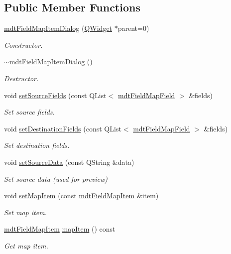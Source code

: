 \subsection*{Public Member Functions}
\begin{DoxyCompactItemize}
\item 
\hyperlink{classmdt_field_map_item_dialog_ac745bae9c7ce26f72aa081bc54ac5f22}{mdt\-Field\-Map\-Item\-Dialog} (\hyperlink{class_q_widget}{Q\-Widget} $\ast$parent=0)
\begin{DoxyCompactList}\small\item\em Constructor. \end{DoxyCompactList}\item 
\hyperlink{classmdt_field_map_item_dialog_a12f195eeceb6729557a9e05835b7ca3f}{$\sim$mdt\-Field\-Map\-Item\-Dialog} ()
\begin{DoxyCompactList}\small\item\em Destructor. \end{DoxyCompactList}\item 
void \hyperlink{classmdt_field_map_item_dialog_a97e6808b1c3b3bb5748a0fcc98a439c9}{set\-Source\-Fields} (const Q\-List$<$ \hyperlink{classmdt_field_map_field}{mdt\-Field\-Map\-Field} $>$ \&fields)
\begin{DoxyCompactList}\small\item\em Set source fields. \end{DoxyCompactList}\item 
void \hyperlink{classmdt_field_map_item_dialog_a0fe47b3b9634d292936dfe4e0a4df36e}{set\-Destination\-Fields} (const Q\-List$<$ \hyperlink{classmdt_field_map_field}{mdt\-Field\-Map\-Field} $>$ \&fields)
\begin{DoxyCompactList}\small\item\em Set destination fields. \end{DoxyCompactList}\item 
void \hyperlink{classmdt_field_map_item_dialog_a0e047487ba8b45d2e1ef8bfb9f78c8a6}{set\-Source\-Data} (const Q\-String \&data)
\begin{DoxyCompactList}\small\item\em Set source data (used for preview) \end{DoxyCompactList}\item 
void \hyperlink{classmdt_field_map_item_dialog_a9f0ff77de969dade822684f63ed52595}{set\-Map\-Item} (const \hyperlink{classmdt_field_map_item}{mdt\-Field\-Map\-Item} \&item)
\begin{DoxyCompactList}\small\item\em Set map item. \end{DoxyCompactList}\item 
\hyperlink{classmdt_field_map_item}{mdt\-Field\-Map\-Item} \hyperlink{classmdt_field_map_item_dialog_a37dd9e2cf50228e1f12c59f052b55e85}{map\-Item} () const 
\begin{DoxyCompactList}\small\item\em Get map item. \end{DoxyCompactList}\end{DoxyCompactItemize}


